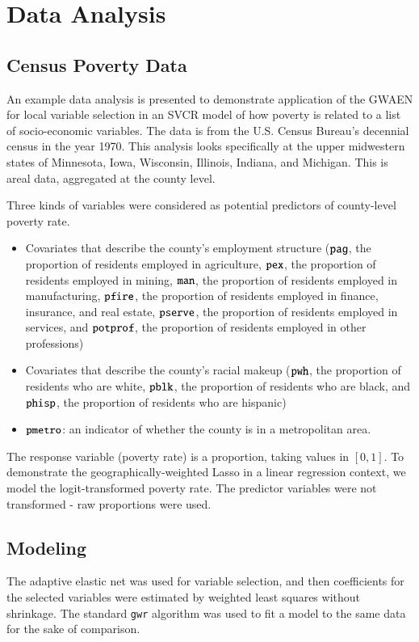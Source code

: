 \documentclass[authoryear, review, 11pt]{elsarticle}
\begin{document}
	


			
\section{Data Analysis\label{section:data-analysis}}
	\subsection{Census Poverty Data}
	An example data analysis is presented to demonstrate application of the GWAEN for local variable selection in an SVCR model of how poverty is related to a list of socio-economic variables. The data is from the U.S. Census Bureau's decennial census in the year 1970. This analysis looks specifically at the upper midwestern states of Minnesota, Iowa, Wisconsin, Illinois, Indiana, and Michigan. This is areal data, aggregated at the county level.
	
	Three kinds of variables  were considered as potential predictors of county-level poverty rate.
	\begin{itemize}
		\item Covariates that describe the county's employment structure ($\verb!pag!$, the proportion of residents employed in agriculture, $\verb!pex!$, the proportion of residents employed in mining, $\verb!man!$, the proportion of residents employed in manufacturing, $\verb!pfire!$, the proportion of residents employed in finance, insurance, and real estate, $\verb!pserve!$, the proportion of residents employed in services, and $\verb!potprof!$, the proportion of residents employed in other professions)\\
		\item Covariates that describe the county's racial makeup ($\verb!pwh!$, the proportion of residents who are white, $\verb!pblk!$, the proportion of residents who are black, and $\verb!phisp!$, the proportion of residents who are hispanic)\\
		\item $\verb!pmetro!$: an indicator of whether the county is in a metropolitan area.
	\end{itemize}
	The response variable (poverty rate) is a proportion, taking values in $[0,1]$. To demonstrate the geographically-weighted Lasso in a linear regression context, we model the logit-transformed poverty rate. The predictor variables were not transformed - raw proportions were used.
	
	\subsection{Modeling}	
	The adaptive elastic net was used for variable selection, and then coefficients for the selected variables were estimated by weighted least squares without shrinkage. The standard {\tt gwr} algorithm was used to fit a model to the same data for the sake of comparison.
	
\end{document}
